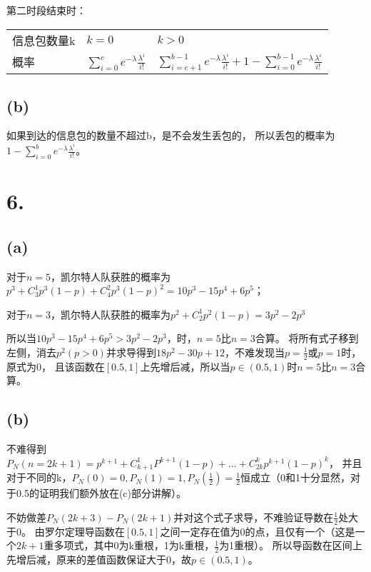 \documentclass[UTF8]{report}
\begin{document}
            第二时段结束时：
            \begin{table}[!htbp]
                \begin{tabular}{lll}
                    信息包数量k & $k = 0$ & $k > 0$ \\
                    概率 & $\sum_{i = 0}^c e^{-\lambda}\frac{\lambda^i}{i!}$ &
                    $\sum_{i = c + 1}^{b - 1} e^{-\lambda}\frac{\lambda^i}{i!} + 1 - \sum_{i = 0}^{b - 1}e^{-\lambda}\frac{\lambda^i}{i!}$
                \end{tabular}
            \end{table}
        \subsection*{(b)}
            如果到达的信息包的数量不超过b，是不会发生丢包的，
            所以丢包的概率为$1 - \sum_{i = 0}^{b}e^{-\lambda}\frac{\lambda^i}{i!}$。
    \section*{6.}
        \subsection*{(a)}
            对于$n = 5$，凯尔特人队获胜的概率为$p^3 + C_3^1p^3(1 - p) + C_4^2p^3(1 - p)^2 = 10p^3 - 15p^4 + 6p^5$；

            对于$n = 3$，凯尔特人队获胜的概率为$p^2 + C_2^1p^2(1 - p) = 3p^2 - 2p^3$

            所以当$10p^3 - 15p^4 + 6p^5 > 3p^2 - 2p^3$，时，$n = 5$比$n = 3$合算。
            将所有式子移到左侧，消去$p^2(p > 0)$并求导得到$18p^2 - 30p + 12$，不难发现当$p = \frac{1}{2}$或$p = 1$时，原式为0，
            且该函数在$[0.5, 1]$上先增后减，所以当$p \in (0.5, 1)$时$n = 5$比$n = 3$合算。
        \subsection*{(b)}
            不难得到$P_N(n = 2k + 1) = p^{k + 1} + C_{k + 1}^1P^{k+1}(1 - p) + \dots + C_{2k}^kp^{k + 1}(1 - p)^k$，
            并且对于不同的k，$P_N(0) = 0, P_N(1) = 1, P_N(\frac{1}{2}) = \frac{1}{2}$恒成立（0和1十分显然，对于0.5的证明我们额外放在(c)部分讲解）。

            不妨做差$P_N(2k + 3) - P_N(2k + 1)$并对这个式子求导，不难验证导数在$\frac{1}{2}$处大于0。
            由罗尔定理导函数在$[0.5, 1]$之间一定存在值为0的点，且仅有一个（这是一个$2k + 1$重多项式，其中0为k重根，1为k重根，$\frac{1}{2}$为1重根）。
            所以导函数在区间上先增后减，原来的差值函数保证大于0，故$p \in (0.5, 1)$。
\end{document}
